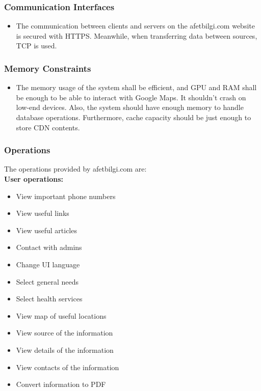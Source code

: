 \documentclass[listof=nochaptergap]{report}
\begin{document}
        \subsubsection {Communication Interfaces}
        \begin{itemize}
            \item The communication between clients and servers on the afetbilgi.com website is secured with HTTPS. Meanwhile, when transferring data between sources, TCP is used.
        \end{itemize}
        \subsubsection{Memory Constraints}
        \begin{itemize}
            \item The memory usage of the system shall be efficient, and GPU and RAM shall be enough to be able to interact with Google Maps. It shouldn't crash on low-end devices. Also, the system should have enough memory to handle database operations. Furthermore, cache capacity should be just enough to store CDN contents.
        \end{itemize}
        \subsubsection{Operations}
        The operations provided by afetbilgi.com are:
        ~\\
        
        \textbf{User operations:}
        \begin{itemize}
            \item View important phone numbers
            \item View useful links
            \item View useful articles
            \item Contact with admins
            \item Change UI language
            \item Select general needs
            \item Select health services
            \item View map of useful locations
            \item View source of the information
            \item View details of the information
            \item View contacts of the information
            \item Convert information to PDF 
        \end{itemize}
\end{document}
